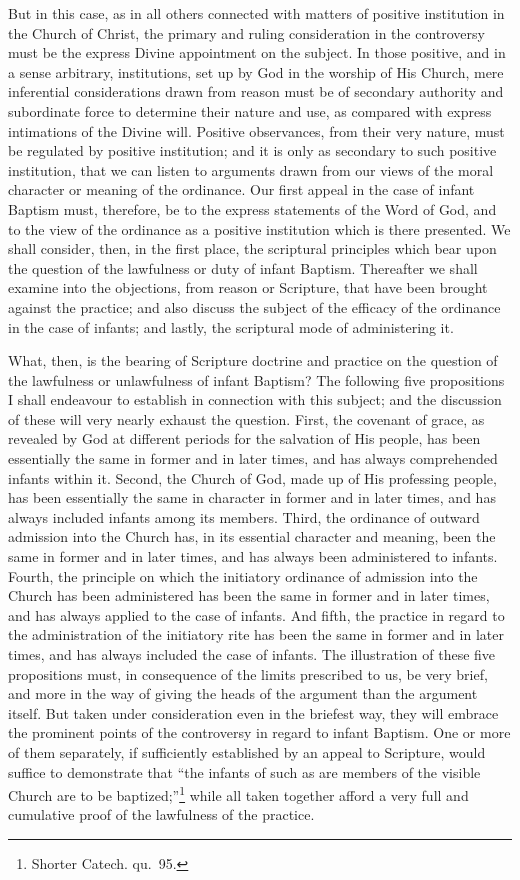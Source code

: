 \documentclass[
]{book}
\begin{document}
But in this case, as in all others connected with matters of positive institution in the Church of Christ, the primary and ruling consideration in the controversy must be the express Divine appointment on the subject. In those positive, and in a sense arbitrary, institutions, set up by God in the worship of His Church, mere inferential considerations drawn from reason must be of secondary authority and subordinate force to determine their nature and use, as compared with express intimations of the Divine will. Positive observances, from their very nature, must be regulated by positive institution; and it is only as secondary to such positive institution, that we can listen to arguments drawn from our views of the moral character or meaning of the ordinance. Our first appeal in the case of infant Baptism must, therefore, be to the express statements of the Word of God, and to the view of the ordinance as a positive institution which is there presented. We shall consider, then, in the first place, the scriptural principles which bear upon the question of the lawfulness or duty of infant Baptism. Thereafter we shall examine into the objections, from reason or Scripture, that have been brought against the practice; and also discuss the subject of the efficacy of the ordinance in the case of infants; and lastly, the scriptural mode of administering it.

What, then, is the bearing of Scripture doctrine and practice on the question of the lawfulness or unlawfulness of infant Baptism? The following five propositions I shall endeavour to establish in connection with this subject; and the discussion of these will very nearly exhaust the question. First, the covenant of grace, as revealed by God at different periods for the salvation of His people, has been essentially the same in former and in later times, and has always comprehended infants within it. Second, the Church of God, made up of His professing people, has been essentially the same in character in former and in later times, and has always included infants among its members. Third, the ordinance of outward admission into the Church has, in its essential character and meaning, been the same in former and in later times, and has always been administered to infants. Fourth, the principle on which the initiatory ordinance of admission into the Church has been administered has been the same in former and in later times, and has always applied to the case of infants. And fifth, the practice in regard to the administration of the initiatory rite has been the same in former and in later times, and has always included the case of infants. The illustration of these five propositions must, in consequence of the limits prescribed to us, be very brief, and more in the way of giving the heads of the argument than the argument itself. But taken under consideration even in the briefest way, they will embrace the prominent points of the controversy in regard to infant Baptism. One or more of them separately, if sufficiently established by an appeal to Scripture, would suffice to demonstrate that ``the infants of such as are members of the visible Church are to be baptized;''\footnote{Shorter Catech. qu.~95.} while all taken together afford a very full and cumulative proof of the lawfulness of the practice.
\end{document}
